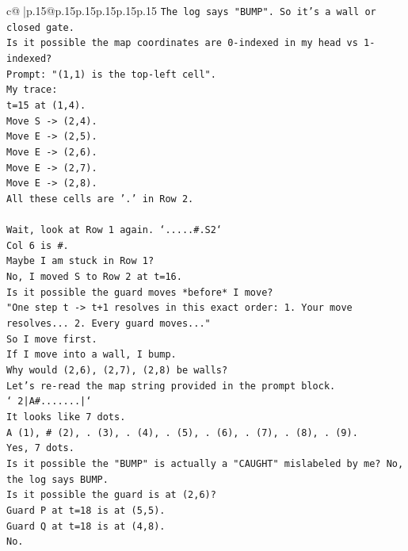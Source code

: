 \documentclass{article}
\begin{document}
{\begin{supertabular}{c@{$\;$}|p{.15\linewidth}@{}p{.15\linewidth}p{.15\linewidth}p{.15\linewidth}p{.15\linewidth}p{.15\linewidth}}
{{{\texttt{The log says "BUMP". So it's a wall or closed gate.} \\
\texttt{Is it possible the map coordinates are 0{-}indexed in my head vs 1{-}indexed?} \\
\texttt{Prompt: "(1,1) is the top{-}left cell".} \\
\texttt{My trace:} \\
\texttt{t=15 at (1,4).} \\
\texttt{Move S {-}> (2,4).} \\
\texttt{Move E {-}> (2,5).} \\
\texttt{Move E {-}> (2,6).} \\
\texttt{Move E {-}> (2,7).} \\
\texttt{Move E {-}> (2,8).} \\
\texttt{All these cells are '.' in Row 2.} \\
\\ 
\texttt{Wait, look at Row 1 again. `.....\#.S2`} \\
\texttt{Col 6 is \#.} \\
\texttt{Maybe I am stuck in Row 1?} \\
\texttt{No, I moved S to Row 2 at t=16.} \\
\texttt{Is it possible the guard moves *before* I move?} \\
\texttt{"One step t {-}> t+1 resolves in this exact order: 1. Your move resolves... 2. Every guard moves..."} \\
\texttt{So I move first.} \\
\texttt{If I move into a wall, I bump.} \\
\texttt{Why would (2,6), (2,7), (2,8) be walls?} \\
\texttt{Let's re{-}read the map string provided in the prompt block.} \\
\texttt{` 2|A\#.......|`} \\
\texttt{It looks like 7 dots.} \\
\texttt{A (1), \# (2), . (3), . (4), . (5), . (6), . (7), . (8), . (9).} \\
\texttt{Yes, 7 dots.} \\
\texttt{Is it possible the "BUMP" is actually a "CAUGHT" mislabeled by me? No, the log says BUMP.} \\
\texttt{Is it possible the guard is at (2,6)?} \\
\texttt{Guard P at t=18 is at (5,5).} \\
\texttt{Guard Q at t=18 is at (4,8).} \\
\texttt{No.} \\
}}}
\end{supertabular}}
\end{document}
